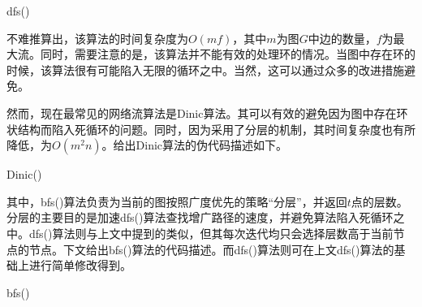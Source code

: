 \begin{algorithm}
\caption{dfs()}
\end{algorithm}

\par 不难推算出，该算法的时间复杂度为$O(mf)$，其中$m$为图$G$中边的数量，$f$为最大流。同时，需要注意的是，该算法并不能有效的处理环的情况。当图中存在环的时候，该算法很有可能陷入无限的循环之中。当然，这可以通过众多的改进措施避免。

\par 然而，现在最常见的网络流算法是Dinic算法。其可以有效的避免因为图中存在环状结构而陷入死循环的问题。同时，因为采用了分层的机制，其时间复杂度也有所降低，为$O(m^2n)$。给出Dinic算法的伪代码描述如下。

\begin{algorithm}
\caption{Dinic()}
\end{algorithm}

\par 其中，bfs()算法负责为当前的图按照广度优先的策略“分层”，并返回$t$点的层数。分层的主要目的是加速dfs()算法查找增广路径的速度，并避免算法陷入死循环之中。dfs()算法则与上文中提到的类似，但其每次迭代均只会选择层数高于当前节点的节点。下文给出bfs()算法的代码描述。而dfs()算法则可在上文dfs()算法的基础上进行简单修改得到。

\begin{algorithm}
\caption{bfs()}

\end{algorithm}

